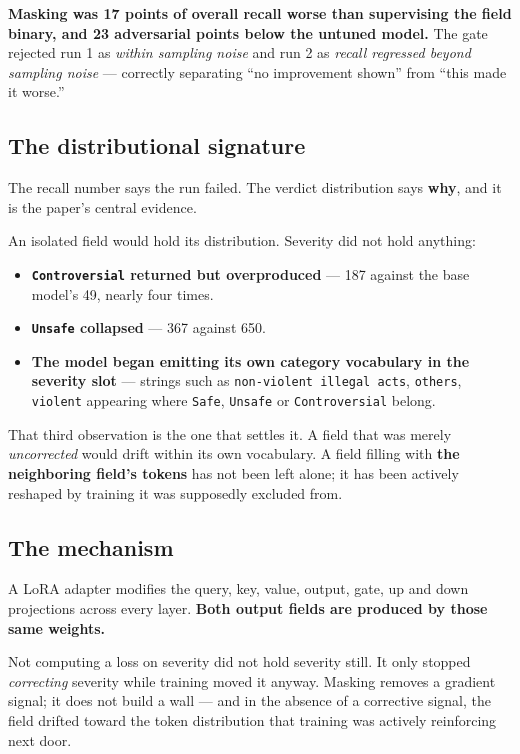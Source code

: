 \documentclass[10pt]{article}
\providecommand{\tightlist}{\setlength{\itemsep}{0pt}\setlength{\parskip}{0pt}}
\begin{document}
\textbf{Masking was 17 points of overall recall worse than supervising the field binary, and 23 adversarial
points below the untuned model.} The gate rejected run 1 as \emph{within sampling noise} and run 2 as
\emph{recall regressed beyond sampling noise} --- correctly separating ``no improvement shown'' from ``this
made it worse.''

\subsection{The distributional signature}

The recall number says the run failed. The verdict distribution says \textbf{why}, and it is the paper's
central evidence.

An isolated field would hold its distribution. Severity did not hold anything:

\begin{itemize}
\tightlist
\item
  \textbf{\texttt{Controversial} returned but overproduced} --- 187 against the base model's 49, nearly four times.
\item
  \textbf{\texttt{Unsafe} collapsed} --- 367 against 650.
\item
  \textbf{The model began emitting its own category vocabulary in the severity slot} --- strings such as
  \texttt{non-violent\ illegal\ acts}, \texttt{others}, \texttt{violent} appearing where \texttt{Safe}, \texttt{Unsafe} or \texttt{Controversial}
  belong.
\end{itemize}

That third observation is the one that settles it. A field that was merely \emph{uncorrected} would drift
within its own vocabulary. A field filling with \textbf{the neighboring field's tokens} has not been left
alone; it has been actively reshaped by training it was supposedly excluded from.

\subsection{The mechanism}

A LoRA adapter modifies the query, key, value, output, gate, up and down projections across every
layer. \textbf{Both output fields are produced by those same weights.}

Not computing a loss on severity did not hold severity still. It only stopped \emph{correcting} severity
while training moved it anyway. Masking removes a gradient signal; it does not build a wall --- and in
the absence of a corrective signal, the field drifted toward the token distribution that training was
actively reinforcing next door.
\end{document}
